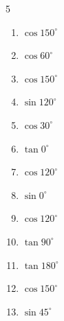 \begin{multicols}{5}
\begin{enumerate}
  \item $\displaystyle \cos{150^\circ}$


  \item $\displaystyle \cos{60^\circ}$


  \item $\displaystyle \cos{150^\circ}$


  \item $\displaystyle \sin{120^\circ}$


  \item $\displaystyle \cos{30^\circ}$


  \item $\displaystyle \tan{0^\circ}$

        \phantom{$\displaystyle =0$}

  \item $\displaystyle \cos{120^\circ}$


  \item $\displaystyle \sin{0^\circ}$

        \phantom{$\displaystyle =0$}

\columnbreak %

  \item $\displaystyle \cos{120^\circ}$


  \item $\displaystyle \tan{90^\circ}$

        \phantom{$\displaystyle なし$}

  \item $\displaystyle \tan{180^\circ}$

        \phantom{$\displaystyle =0$}

  \item $\displaystyle \cos{150^\circ}$


  \item $\displaystyle \sin{45^\circ}$


\end{enumerate}
\end{multicols}

